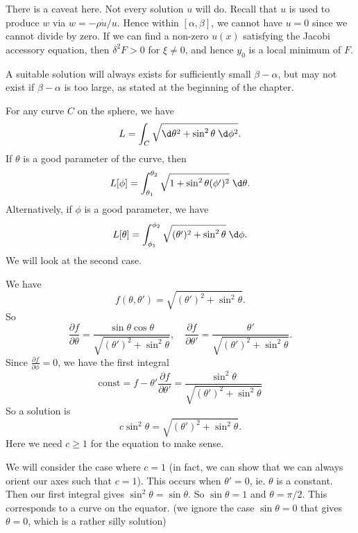 \documentclass[a4paper]{article}
\begin{document}
There is a caveat here. Not every solution $u$ will do. Recall that $u$ is used to produce $w$ via $w = -\rho\dot{u}/u$. Hence within $[\alpha, \beta]$, we cannot have $u = 0$ since we cannot divide by zero. If we can find a non-zero $u(x)$ satisfying the Jacobi accessory equation, then $\delta^2 F > 0$ for $\xi \not= 0$, and hence $y_0$ is a local minimum of $F$.

A suitable solution will always exists for sufficiently small $\beta - \alpha$, but may not exist if $\beta - \alpha$ is too large, as stated at the beginning of the chapter.

\begin{eg}
  For any curve $C$ on the sphere, we have
  \[
    L = \int_C \sqrt{\d \theta^2 + \sin^2 \theta \;\d \phi^2}.
  \]
  If $\theta$ is a good parameter of the curve, then
  \[
    L[\phi] = \int_{\theta _1}^{\theta_2} \sqrt{1 + \sin^2 \theta (\phi')^2}\;\d \theta.
  \]
  Alternatively, if $\phi$ is a good parameter, we have
  \[
    L[\theta] = \int_{\phi_1}^{\phi_2}\sqrt{(\theta')^2 + \sin^2 \theta}\;\d \phi.
  \]
  We will look at the second case.

  We have
  \[
    f(\theta, \theta') = \sqrt{(\theta')^2 + \sin^2 \theta}.
  \]
  So
  \[
    \frac{\partial f}{\partial \theta} = \frac{\sin \theta\cos \theta}{\sqrt{(\theta')^2 + \sin^2 \theta}},\quad \frac{\partial f}{\partial \theta'} = \frac{\theta'}{\sqrt{(\theta')^2 + \sin^2 \theta}}.
  \]
  Since $\frac{\partial f}{\partial \phi} = 0$, we have the first integral
  \[
    \text{const} = f - \theta' \frac{\partial f}{\partial \theta'} = \frac{\sin^2 \theta}{\sqrt{(\theta')^2 + \sin^2 \theta}}
  \]
  So a solution is
  \[
    c\sin^2 \theta = \sqrt{(\theta')^2 + \sin^2 \theta}.
  \]
  Here we need $c \geq 1$ for the equation to make sense.

  We will consider the case where $c = 1$ (in fact, we can show that we can always orient our axes such that $c = 1$). This occurs when $\theta' = 0$, ie. $\theta$ is a constant. Then our first integral gives $\sin^2 \theta = \sin \theta$. So $\sin \theta = 1$ and $\theta = \pi/2$. This corresponds to a curve on the equator. (we ignore the case $\sin \theta = 0$ that gives $\theta = 0$, which is a rather silly solution)


\end{eg}
\end{document}
